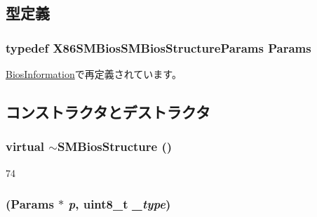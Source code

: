 \subsection{型定義}
\hypertarget{classX86ISA_1_1SMBios_1_1SMBiosStructure_a55e55a28dd1c31e4bbc87e379625f1b5}{
\subsubsection[{Params}]{\setlength{\rightskip}{0pt plus 5cm}typedef X86SMBiosSMBiosStructureParams {\bf Params}}}
\label{classX86ISA_1_1SMBios_1_1SMBiosStructure_a55e55a28dd1c31e4bbc87e379625f1b5}


\hyperlink{classX86ISA_1_1SMBios_1_1BiosInformation_a80894fc0e6b20b3b6808ca61edf19aa1}{BiosInformation}で再定義されています。

\subsection{コンストラクタとデストラクタ}
\hypertarget{classX86ISA_1_1SMBios_1_1SMBiosStructure_aa6b1cb47e97aa37b3873b78bc23d1e72}{
\subsubsection[{$\sim$SMBiosStructure}]{\setlength{\rightskip}{0pt plus 5cm}virtual $\sim${\bf SMBiosStructure} ()}}
\label{classX86ISA_1_1SMBios_1_1SMBiosStructure_aa6b1cb47e97aa37b3873b78bc23d1e72}



\begin{DoxyCode}
74     {}
\end{DoxyCode}
\hypertarget{classX86ISA_1_1SMBios_1_1SMBiosStructure_abcb5ae9a7643c8b6747e45af015dbe72}{
\subsubsection[{SMBiosStructure}]{ ({\bf Params} $\ast$ {\em p}, \/  uint8\_\-t {\em \_\-type})}}
\label{classX86ISA_1_1SMBios_1_1SMBiosStructure_abcb5ae9a7643c8b6747e45af015dbe72}




